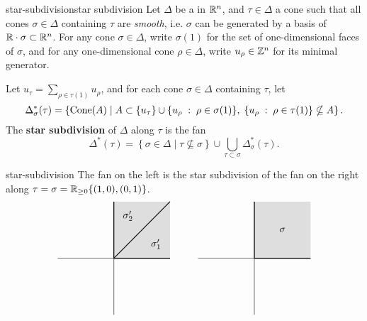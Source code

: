 \begin{topic}{star-subdivision}{star subdivision}
    Let $\Delta$ be a  in $\mathbb{R}^n$, and $\tau \in \Delta$ a cone such that all cones $\sigma \in \Delta$ containing $\tau$ are \textit{smooth}, i.e. $\sigma$ can be generated by a basis of $\mathbb{R} \cdot \sigma \subset \mathbb{R}^n$. For any cone $\sigma \in \Delta$, write $\sigma(1)$ for the set of one-dimensional faces of $\sigma$, and for any one-dimensional cone $\rho \in \Delta$, write $u_\rho \in \mathbb{Z}^n$ for its minimal generator.
    
    Let $u_\tau = \sum_{\rho \in \tau(1)} u_\rho$, and for each cone $\sigma \in \Delta$ containing $\tau$, let
    \[ \Delta^*_\sigma(\tau) = \left\{ \textup{Cone}(A) \;|\; A \subset \{ u_\tau \} \cup \{ u_\rho \;:\; \rho \in \sigma(1) \}, \; \{ u_\rho \;:\; \rho \in \tau(1) \} \nsubseteq A \right\} . \]
    The \textbf{star subdivision} of $\Delta$ along $\tau$ is the fan
    \[ \Delta^*(\tau) = \left\{ \sigma \in \Delta \;|\; \tau \nsubseteq \sigma \right\} \cup \bigcup_{\tau \subset \sigma} \Delta^*_\sigma(\tau) . \]
\end{topic}

\begin{example}{star-subdivision}
    The fan on the left is the star subdivision of the fan on the right along $\tau = \sigma = \mathbb{R}_{\ge 0} \{ (1, 0), (0, 1) \}$.
    \[ \begin{tikzpicture}
        \begin{scope}[shift={(-5,0)}]
            \draw (-2, 0) -- (2, 0);
            \draw (0, -2) -- (0, 2);
            \fill[fill=gray!50, opacity=0.5] (0, 0) -- (0, 2) -- (2, 2) -- (2, 0);
            \draw[thick] (0, 0) -- (2, 0);
            \draw[thick] (0, 0) -- (0, 2);
            \draw[thick] (0, 0) -- (2, 2);
            \node at (1.5, 0.5) {$\sigma'_1$};
            \node at (0.5, 1.5) {$\sigma'_2$};
        \end{scope}
        \begin{scope}
            \draw (-2, 0) -- (2, 0);
            \draw (0, -2) -- (0, 2);
            \fill[fill=gray!50, opacity=0.5] (0, 0) -- (0, 2) -- (2, 2) -- (2, 0);
            \draw[thick] (0, 0) -- (2, 0);
            \draw[thick] (0, 0) -- (0, 2);
            \node at (1, 1) {$\sigma$};
        \end{scope}
    \end{tikzpicture} \]
\end{example}
